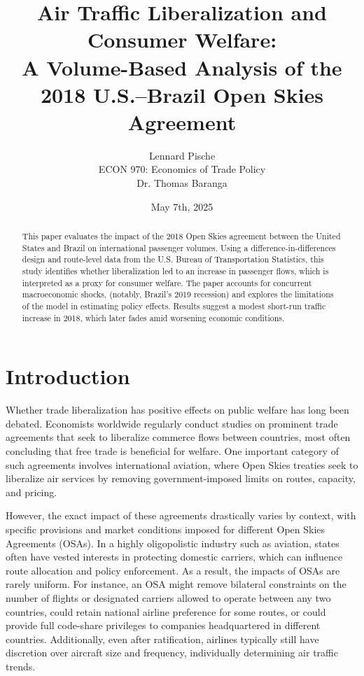 \documentclass[12pt]{article}
\title{Air Traffic Liberalization and Consumer Welfare: \\ A Volume-Based Analysis of the 2018 U.S.--Brazil Open Skies Agreement}
\author{Lennard Pische \\ ECON 970: Economics of Trade Policy \\ Dr. Thomas Baranga}
\date{May 7th, 2025}
\begin{document}
\maketitle

\begin{abstract}
\noindent
This paper evaluates the impact of the 2018 Open Skies agreement between the United States and Brazil on international passenger volumes. Using a difference-in-differences design and route-level data from the U.S. Bureau of Transportation Statistics, this study identifies whether liberalization led to an increase in passenger flows, which is interpreted as a proxy for consumer welfare. The paper accounts for concurrent macroeconomic shocks, (notably, Brazil's 2019 recession) and explores the limitations of the model in estimating policy effects. Results suggest a modest short-run traffic increase in 2018, which later fades amid worsening economic conditions.
\end{abstract}

\newpage

\tableofcontents

\newpage

\section{Introduction}
Whether trade liberalization has positive effects on public welfare has long been debated. Economists worldwide regularly conduct studies on prominent trade agreements that seek to liberalize commerce flows between countries, most often concluding that free trade is beneficial for welfare. One important category of such agreements involves international aviation, where Open Skies treaties seek to liberalize air services by removing government-imposed limits on routes, capacity, and pricing. 

However, the exact impact of these agreements drastically varies by context, with specific provisions and market conditions imposed for different Open Skies Agreements (OSAs). In a highly oligopolistic industry such as aviation, states often have vested interests in protecting domestic carriers, which can influence route allocation and policy enforcement. As a result, the impacts of OSAs are rarely uniform. For instance, an OSA might remove bilateral constraints on the number of flights or designated carriers allowed to operate between any two countries, could retain national airline preference for some routes, or could provide full code-share privileges to companies headquartered in different countries. Additionally, even after ratification, airlines typically still have discretion over aircraft size and frequency, individually determining air traffic trends.
\end{document}

